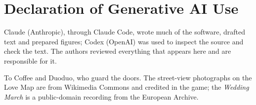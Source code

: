 \documentclass[sigconf,nonacm]{acmart}
\begin{document}
\section*{Declaration of Generative AI Use}
Claude (Anthropic), through Claude Code, wrote much of the software, drafted text and prepared
figures; Codex (OpenAI) was used to inspect the source and check the text. The authors reviewed
everything that appears here and are responsible for it.

\begin{acks}
To Coffee and Duoduo, who guard the doors. The street-view photographs on the Love Map are from
Wikimedia Commons and credited in the game; the \emph{Wedding March} is a public-domain recording
from the European Archive.
\end{acks}



\end{document}
